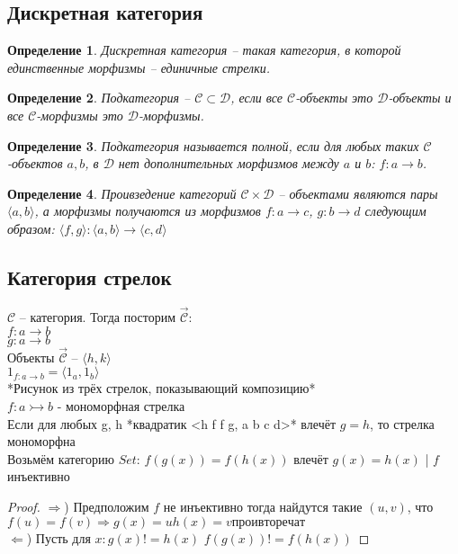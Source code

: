 \documentclass[a4paper, fleqn, draft]{report}
\newtheorem*{defn}{Определение}
\begin{document}
\subsection{Дискретная категория}
\begin{defn}
Дискретная категория -- такая категория, в которой единственные морфизмы --
единичные стрелки.
\end{defn}
\begin{defn}
Подкатегория -- $\mathcal{C} \subset \mathcal{D}$, если все $\mathcal{C}$-объекты это $\mathcal{D}$-объекты и все
$\mathcal{C}$-морфизмы это $\mathcal{D}$-морфизмы.
\end{defn}
\begin{defn}
Подкатегория называется полной, если для любых таких $\mathcal{C}$-объектов $a, b$, в $\mathcal{D}$ нет
дополнительных морфизмов между $a$ и $b$: $f\colon a \to b$.
\end{defn}
\begin{defn}
Проивзедение категорий $\mathcal{C} \times \mathcal{D}$ -- объектами являются пары $\langle a, b \rangle$,
а морфизмы получаются из морфизмов $f\colon a \to c$, $g\colon b \to d$ следующим образом:
$\langle f, g \rangle\colon \langle a, b \rangle \to \langle c,d \rangle$
\end{defn}

\subsection{Категория стрелок}
$\mathcal{C}$ -- категория. Тогда посторим $\overrightarrow{\mathcal{C}}$: \\
$f\colon a \to b$ \\
$g\colon a \to b$ \\

Объекты $\overrightarrow{\mathcal{C}}$ -- $\langle h, k \rangle$ \\
$1_{f\colon a \to b} = \langle 1_a, 1_b \rangle$ \\

*Рисунок из трёх стрелок, показывающий композицию* \\

$f: a \rightarrowtail b$ - мономорфная стрелка \\
Если для любых g, h *квадратик <h f f g, a b c d>* влечёт $g = h$, то стрелка
мономорфна \\

Возьмём категорию $Set$: $f(g(x)) = f(h(x))$ влечёт $g(x)=h(x)$ | $f$ инъективно
\begin{proof}
  $\Rightarrow$) Предположим $f$ не инъективно тогда найдутся такие $(u, v)$, что $f(u) = f(v)
  \Rightarrow g(x) = u h(x) = v проивторечат$ \\
  $\Leftarrow$) Пусть для $x: g(x) != h(x)$ $f(g(x)) != f(h(x))$
\end{proof}
\end{document}
